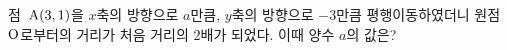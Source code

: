 점~$\mathrm{A}(3{,}\mkern3mu\mathopen{}1)$을 $x$축의 방향으로 $a$만큼, $y$축의 방향으로 $-3$만큼 평행이동하였더니 원점~$\mathrm{O}$로부터의 거리가 처음 거리의 $2$배가 되었다. 이때 양수 $a$의 값은?
